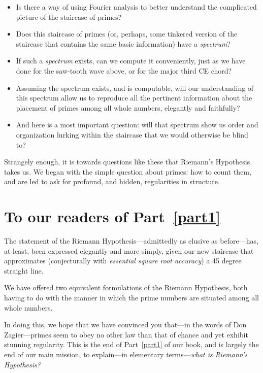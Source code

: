 \documentclass[openany]{book}
\theoremstyle{plain}
\theoremstyle{definition}
\newcommand{\RH}{Riemann Hypothesis\index{Riemann Hypothesis}}
\begin{document}
{\begin{itemize}
\item Is there a way of using Fourier analysis to better understand
  the complicated picture of the staircase of primes?

\item Does this staircase of primes (or, perhaps, some tinkered
  version of the staircase that contains the same basic information)
  have a {\em spectrum}?

\item If such a {\em spectrum} exists, can we compute it conveniently,
  just as we have done for the saw-tooth wave above, or for the major
  third CE chord?


\item Assuming the spectrum exists, and is computable, will our
  understanding of this spectrum allow us to reproduce all the
  pertinent information about the placement of primes among all whole
  numbers, elegantly and faithfully?

\item And here is a most important question: will that spectrum show
  us order and organization lurking within the staircase that we would
  otherwise be blind to?

\end{itemize}


Strangely enough, it is towards questions like these that Riemann's
Hypothesis takes us. We began with the simple question about primes:
how to count them, and are led to ask for profound, and hidden,
regularities in structure.

\chapter{To our readers of Part~\ref{part1}}
The statement of the \RH{}---admittedly as elusive as
before---has, at least, been expressed elegantly and more simply,
given our new staircase that approximates (conjecturally with {\em
  essential square root accuracy}) a 45 degree straight line.

We have offered two equivalent formulations of the \RH{},
both having to do with the manner in which the prime numbers are
situated among all whole numbers.

In doing this, we hope that we have convinced you that---in the words
of Don Zagier---primes seem to obey no other law than that of chance
and yet exhibit stunning regularity.  This is the end of Part~\ref{part1} of our
book, and is largely the end of our main mission, to explain---in
elementary terms---{\em what is Riemann's Hypothesis?}


}
\end{document}
